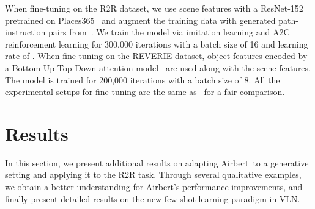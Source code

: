 \RequirePackage[dvipsnames,table]{xcolor} \documentclass[10pt,twocolumn,letterpaper]{article}
\newcommand{\airbert}{Airbert}
\begin{document}
When fine-tuning on the R2R dataset, we use scene features with a ResNet-152 pretrained on Places365~\cite{zhou2017places} and augment the training data with generated path-instruction pairs from~\cite{hao2020prevalent}.
We train the model via imitation learning and A2C reinforcement learning for 300,000 iterations with a batch size of 16 and learning rate of .
When fine-tuning on the REVERIE dataset, object features encoded by a Bottom-Up Top-Down attention model~\cite{anderson2017butd} are used along with the scene features.
The model is trained for 200,000 iterations with a batch size of 8.
All the experimental setups for fine-tuning are the same as~\cite{hong2021recurrentvln} for a fair comparison.


\section{Results}
\label{sec:supp-results}

In this section, we present additional results on adapting \airbert~to a generative setting and applying it to the R2R task.
Through several qualitative examples, we obtain a better understanding for \airbert's performance improvements, and finally present detailed results on the new few-shot learning paradigm in VLN.
\end{document}
